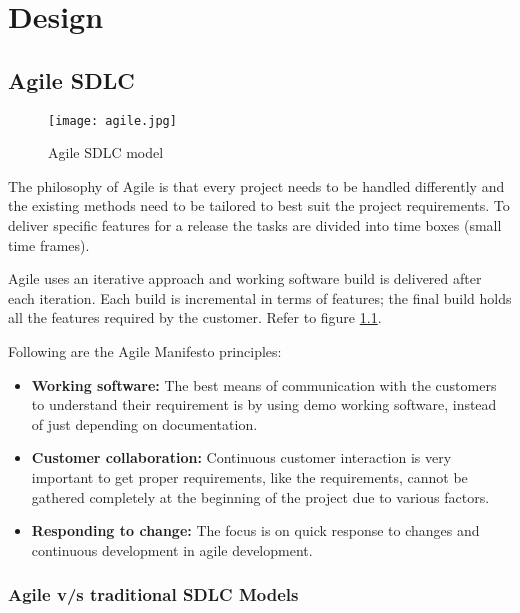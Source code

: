 \chapter{\centering Design}

\section{Agile SDLC}

\begin{figure}[h!]
    \begin{center}
        \texttt{[image: agile.jpg]}
    \end{center}
    \caption{Agile SDLC model}
    \label{fig:agile}
\end{figure}

The philosophy of Agile is that every project needs to be handled differently and the existing methods
need to be tailored to best suit the project requirements. To deliver specific features for a 
release the tasks are divided into time boxes (small time frames).

Agile uses an iterative approach and working software build is delivered after each iteration. 
Each build is incremental in terms of features; the final build holds all the features required by the customer. Refer to figure \ref{fig:agile}.

Following are the Agile Manifesto principles:

\begin{itemize}
    \item \textbf{Working software:} The best means of communication with the customers to understand
    their requirement is by using demo working software, instead of just depending on documentation.
     
    \item \textbf{Customer collaboration:} Continuous customer interaction is very important to get proper
    requirements, like the requirements, cannot be gathered completely at the beginning of the project due 
    to various factors.

    \item \textbf{Responding to change:} The focus is on quick response to changes and continuous development in agile development.
\end{itemize}

\subsection{Agile v/s traditional SDLC Models}

